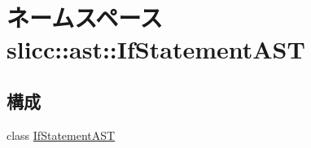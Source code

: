 \hypertarget{namespaceslicc_1_1ast_1_1IfStatementAST}{
\section{ネームスペース slicc::ast::IfStatementAST}
\label{namespaceslicc_1_1ast_1_1IfStatementAST}
}
\subsection*{構成}
\begin{DoxyCompactItemize}
\item 
class \hyperlink{classslicc_1_1ast_1_1IfStatementAST_1_1IfStatementAST}{IfStatementAST}
\end{DoxyCompactItemize}
